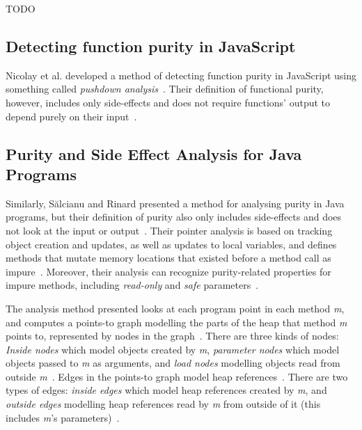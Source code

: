 \documentclass[a4paper,12pt]{article}
\begin{document}
TODO


\subsection{Detecting function purity in JavaScript}
Nicolay et al. developed a method of detecting function purity in JavaScript using something called \textit{pushdown analysis}~\cite{purity-in-javascript}. Their definition of functional purity, however, includes only side-effects and does not require functions' output to depend purely on their input~\cite{purity-in-javascript}.


\subsection{Purity and Side Effect Analysis for Java Programs} \label{sub:Purity and Side Effect Analysis for Java Programs}
Similarly, S\u{a}lcianu and Rinard presented a method for analysing purity in Java programs, but their definition of purity also only includes side-effects and does not look at the input or output~\cite{salcianu}. Their pointer analysis is based on tracking object creation and updates, as well as updates to local variables, and defines methods that mutate memory locations that existed before a method call as impure~\cite{salcianu}. Moreover, their analysis can recognize purity-related properties for impure methods, including \textit{read-only} and \textit{safe} parameters~\cite{salcianu}.

The analysis method presented looks at each program point in each method \textit{m}, and computes a points-to graph modelling the parts of the heap that method \textit{m} points to, represented by nodes in the graph~\cite{salcianu}. There are three kinds of nodes: \textit{Inside nodes} which model objects created by \textit{m}, \textit{parameter nodes} which model objects passed to \textit{m} as arguments, and \textit{load nodes} modelling objects read from outside \textit{m}~\cite{salcianu}. Edges in the points-to graph model heap references~\cite{salcianu}. There are two types of edges: \textit{inside edges} which model heap references created by \textit{m}, and \textit{outside edges} modelling heap references read by \textit{m} from outside of it (this includes \textit{m}'s parameters)~\cite{salcianu}.
\end{document}

